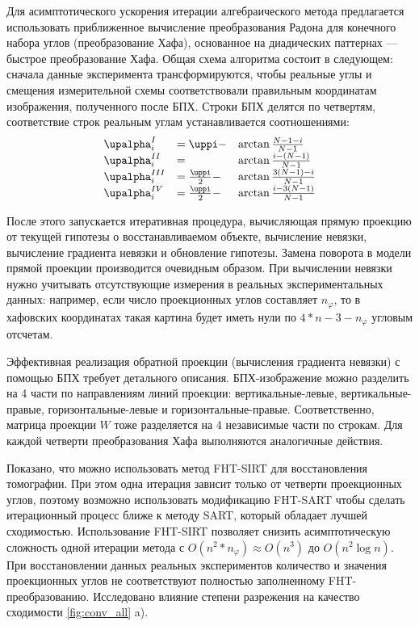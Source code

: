 Для асимптотического ускорения итерации алгебраического метода предлагается использовать приближенное вычисление преобразования Радона для конечного набора углов (преобразование Хафа), основанное на диадических паттернах --- быстрое преобразование Хафа.
Общая схема алгоритма состоит в следующем: сначала данные эксперимента трансформируются, чтобы реальные углы и смещения измерительной схемы соответствовали правильным координатам изображения, полученного после БПХ.
Строки БПХ делятся по четвертям, соответствие строк реальным углам устанавливается соотношениями:
\begin{equation} \notag
\begin{array}{lll}
\alpha^I_i &= \pi - & \arctan{\frac{N-1-i}{N-1}} \\
\alpha^{II}_i &= &\arctan{\frac{i - (N-1)}{N-1}} \\
\alpha^{III}_i &= \frac \pi 2 - & \arctan{\frac{3(N-1)-i}{N-1}} \\
\alpha^{IV}_i &= \frac \pi 2 - & \arctan{\frac{i - 3(N-1)}{N-1}}
\end{array}
\end{equation}


После этого запускается итеративная процедура, вычисляющая прямую проекцию от текущей гипотезы о восстанавливаемом объекте, вычисление невязки, вычисление градиента невязки и обновление гипотезы.
Замена поворота в модели прямой проекции производится очевидным образом.
При вычислении невязки нужно учитывать отсутствующие измерения в реальных экспериментальных данных: например, если число проекционных углов составляет $n_\varphi$, то в хафовских координатах такая картина будет иметь нули по $4 * n - 3 - n_\varphi$ угловым отсчетам.

Эффективная реализация обратной проекции (вычисления градиента невязки) с помощью БПХ требует детального описания.
БПХ-изображение можно разделить на 4 части по направлениям линий проекции: вертикальные-левые, вертикальные-правые, горизонтальные-левые и горизонтальные-правые.
Соответственно, матрица проекции $W$ тоже разделяется на 4 независимые части по строкам.
Для каждой четверти преобразования Хафа выполняются аналогичные действия.

Показано, что можно использовать метод FHT-SIRT для восстановления томографии.
При этом одна итерация зависит только от четверти проекционных углов, поэтому возможно использовать модификацию FHT-SART чтобы сделать итерационный процесс ближе к методу SART, который обладает лучшей сходимостью.
Использование FHT-SIRT позволяет снизить асимптотическую сложность одной итерации метода с $O(n^2 * n_\varphi) \approx O(n^3)$ до $O(n^2 \log n)$.
При восстановлении данных реальных экспериментов количество и значения проекционных углов не соответствуют полностью заполненному FHT-преобразованию. 
Исследовано влияние степени разрежения на качество сходимости \ref{fig:conv_all} a).

